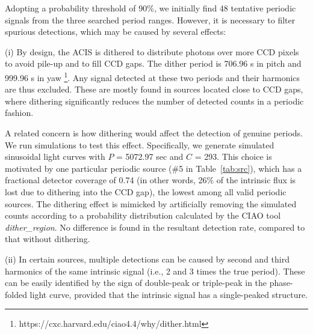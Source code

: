 \documentclass[fleqn,usenatbib]{mnras}
\begin{document}
Adopting a probability threshold of 90\%, we initially find 48 tentative periodic signals from the three searched period ranges. However, it is necessary to filter spurious detections, which may be caused by several effects:

(i) By design, the ACIS is dithered to distribute photons over more CCD pixels to avoid pile-up and to fill CCD gaps. The dither period is 706.96 s in pitch and 999.96 s in yaw {\footnote{https://cxc.harvard.edu/ciao4.4/why/dither.html}}.
Any signal detected at these two periods and their harmonics are thus excluded. These are mostly found in sources located close to CCD gaps, where dithering significantly reduces the number of detected counts in a periodic fashion. 

A related concern is how dithering would affect the detection of genuine periods.  
We run simulations to test this effect. Specifically, we generate simulated sinusoidal light curves with $P$ = 5072.97 sec and $C$ = 293. 
This choice is motivated by one particular periodic source (\#5 in Table~\ref{tab:src}), which has a fractional detector coverage of 0.74 (in other words, 26\% of the intrinsic flux is lost due to dithering into the CCD gap), the lowest among all valid periodic sources. The dithering effect is mimicked by artificially removing the simulated counts according to a probability distribution calculated by the CIAO tool \emph{dither\_region}. 
No difference is found in the resultant detection rate, compared to that without dithering. 

(ii) In certain sources, multiple detections can be caused by second and third harmonics of the same intrinsic signal (i.e., 2 and 3 times the true period). These can be easily identified by the sign of double-peak or triple-peak in the phase-folded light curve, provided that the intrinsic signal has a single-peaked structure. 
\end{document}

